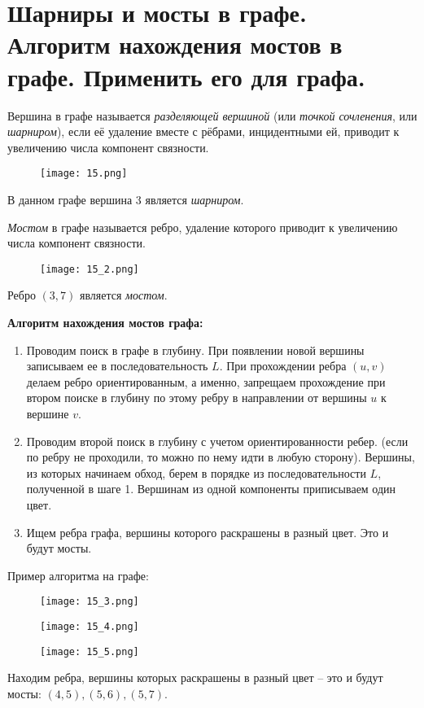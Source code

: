 \section{Шарниры и мосты в графе. Алгоритм нахождения мостов в графе. Применить его для графа.}

\begin{definition}
    Вершина в графе называется \textit{разделяющей вершиной} (или
    \textit{точкой сочленения}, или \textit{шарниром}), если её удаление вместе с рёбрами,
    инцидентными ей, приводит к увеличению числа компонент связности.
\end{definition}

\begin{figure}[h]
    \centering
    \texttt{[image: 15.png]}
\end{figure}

В данном графе вершина 3 является \textit{шарниром}.

\begin{definition}
    \textit{Мостом} в графе называется ребро, удаление которого
    приводит к увеличению числа компонент связности.
\end{definition}

\begin{figure}[h]
    \centering
    \texttt{[image: 15\_2.png]}
\end{figure}

Ребро $(3,7)$ является \textit{мостом}.

\newpage
\textbf{Алгоритм нахождения мостов графа:}
\begin{enumerate}[left=0.0em, labelsep=1em, topsep=0.0em, itemsep=0pt, parsep=0.5em]
    \item Проводим поиск в графе в глубину. При появлении новой вершины
    записываем ее в последовательность $L$. При прохождении ребра $(u,v)$ делаем
    ребро ориентированным, а именно, запрещаем прохождение при втором
    поиске в глубину по этому ребру в направлении от вершины $u$ к вершине $v$.
    \item Проводим второй поиск в глубину с учетом ориентированности ребер.
    (если по ребру не проходили, то можно по нему идти в любую сторону).
    Вершины, из которых начинаем обход, берем в порядке из
    последовательности $L$, полученной в шаге 1. Вершинам из одной компоненты
    приписываем один цвет.
    \item Ищем ребра графа, вершины которого раскрашены в разный цвет. Это
    и будут мосты.
\end{enumerate}

Пример алгоритма на графе:
\begin{figure}[h]
    \centering
    \texttt{[image: 15\_3.png]}
\end{figure}
\begin{figure}[h]
    \centering
    \texttt{[image: 15\_4.png]}
\end{figure}
\begin{figure}[h]
    \centering
    \texttt{[image: 15\_5.png]}
\end{figure}

Находим ребра, вершины которых раскрашены в разный цвет -- это и будут
мосты: $(4,5), (5,6), (5,7)$.